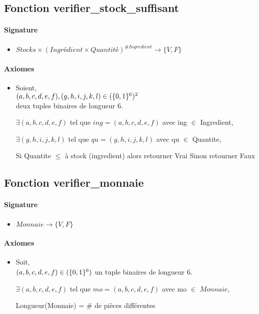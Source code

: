\documentclass[]{article}
\begin{document}
\subsection*{Fonction verifier\_stock\_suffisant}
\paragraph{Signature}
\begin{itemize}
\item
  $Stocks \times (Ingrédient \times Quantité)^{\#Ingredient} \longrightarrow  \{V, F\}$
\end{itemize}
\paragraph{Axiomes}
\begin{itemize}
\item
 Soient, \\ $(a,b,c,d,e,f), (g,h,i,j,k,l)
 \in(\{0,1\}\textsuperscript{6})\textsuperscript{2}$ \\deux tuples binaires de longueur 6.


$\exists (a,b,c,d,e,f)$ tel que $ing = (a,b,c,d,e,f)$ avec ing $\in$ Ingredient,

$\exists (g,h,i,j,k,l)$ tel que $qu =(g,h,i,j,k,l)$ avec qu $\in$ Quantite,

Si Quantite $\leq$ à stock (ingredient) alors retourner Vrai
Sinon retourner Faux
\end{itemize}

\subsection*{Fonction verifier\_monnaie}
\paragraph{Signature}
\begin{itemize}
\item
  $Monnaie \longrightarrow  \{V, F\}$
\end{itemize}
\paragraph{Axiomes}
\begin{itemize}
\item
  Soit, \\ $(a,b,c,d,e,f) \in(\{0,1\}\textsuperscript{6})$ un tuple binaires de longueur 6.

$\exists (a,b,c,d,e,f)$ tel que $mo = (a,b,c,d,e,f)$ avec mo $\in$ $Monnaie$,

Longueur(Monnaie) = $\#$ de pièces différentes
\end{itemize}
\end{document}
